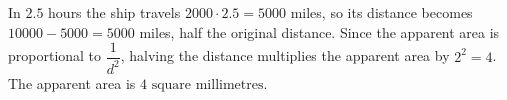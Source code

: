 In $2.5$ hours the ship travels $2000\cdot2.5=5000$ miles, so its distance becomes $10000-5000=5000$ miles, half the original distance. Since the apparent area is proportional to $\dfrac{1}{d^2}$, halving the distance multiplies the apparent area by $2^2=4$. The apparent area is $\boxed{4\text{ square millimetres}}$.
